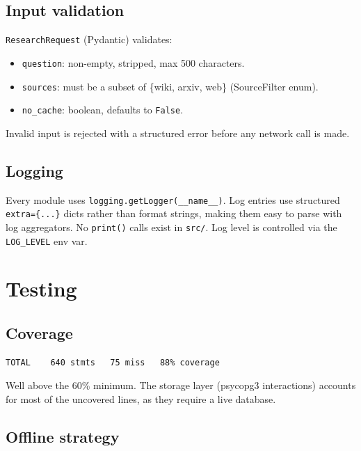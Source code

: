 \documentclass[12pt,a4paper]{article}
\begin{document}
\subsection{Input validation}

\texttt{ResearchRequest} (Pydantic) validates:
\begin{itemize}
  \item \texttt{question}: non-empty, stripped, max 500 characters.
  \item \texttt{sources}: must be a subset of \{wiki, arxiv, web\} (SourceFilter enum).
  \item \texttt{no\_cache}: boolean, defaults to \texttt{False}.
\end{itemize}

Invalid input is rejected with a structured error before any network call is made.

\subsection{Logging}

Every module uses \texttt{logging.getLogger(\_\_name\_\_)}. Log entries use structured
\texttt{extra=\{...\}} dicts rather than format strings, making them easy to parse with
log aggregators. No \texttt{print()} calls exist in \texttt{src/}. Log level is controlled
via the \texttt{LOG\_LEVEL} env var.

\section{Testing}

\subsection{Coverage}

\begin{verbatim}
TOTAL    640 stmts   75 miss   88% coverage
\end{verbatim}

Well above the 60\% minimum. The storage layer (psycopg3 interactions) accounts for most
of the uncovered lines, as they require a live database.

\subsection{Offline strategy}
\end{document}
